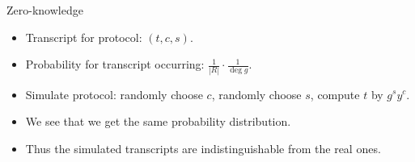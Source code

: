 \begin{frame}
  \begin{block}{Zero-knowledge}
    \begin{itemize}
      \item Transcript for protocol: \((t, c, s)\).

      \item Probability for transcript occurring: \(\frac{1}{|R|}\cdot 
          \frac{1}{\deg g}\).

        \pause{}

      \item Simulate protocol: randomly choose \(c\), randomly choose \(s\), 
        compute \(t\) by \(g^s y^c\).

        \pause{}

      \item We see that we get the same probability distribution.
      \item Thus the simulated transcripts are indistinguishable from the real 
        ones.
    \end{itemize}
  \end{block}
\end{frame}



\begin{frame}[allowframebreaks]
  \printbibliography
\end{frame}

